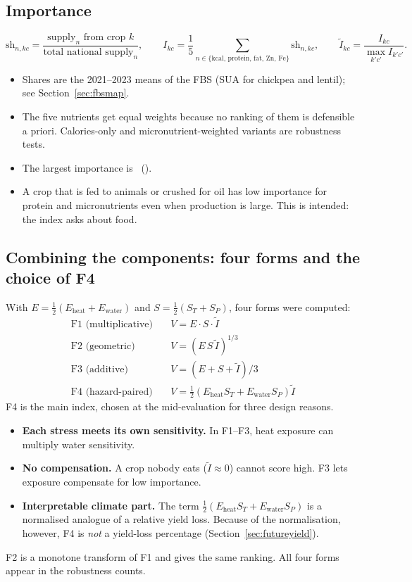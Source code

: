 \subsection{Importance}\label{sec:importance}
\begin{equation}\label{eq:importance}
\text{sh}_{n,kc} = \frac{\text{supply}_{n}\text{ from crop }k}{\text{total national supply}_{n}},\qquad
I_{kc} = \frac15\sum_{n\in\{\text{kcal, protein, fat, Zn, Fe}\}} \text{sh}_{n,kc},\qquad
\tilde I_{kc} = \frac{I_{kc}}{\max_{k'c'} I_{k'c'}}.
\end{equation}
\begin{itemize}
\item Shares are the 2021--2023 means of the FBS (SUA for chickpea and lentil); see Section~\ref{sec:fbsmap}.
\item The five nutrients get equal weights because no ranking of them is defensible a priori. Calories-only and
micronutrient-weighted variants are robustness tests.
\item The largest importance is \ ().
\item A crop that is fed to animals or crushed for oil has low importance for protein and micronutrients even
when production is large. This is intended: the index asks about food.
\end{itemize}

\subsection{Combining the components: four forms and the choice of F4}\label{sec:forms}
With $E=\frac12(E_{\text{heat}}+E_{\text{water}})$ and $S=\frac12(S_T+S_P)$, four forms were computed:
\begin{align}
\text{F1 (multiplicative)}\quad & V = E\cdot S\cdot\tilde I \label{eq:f1}\\
\text{F2 (geometric)}\quad & V = (E\,S\,\tilde I)^{1/3} \label{eq:f2}\\
\text{F3 (additive)}\quad & V = (E+S+\tilde I)/3 \label{eq:f3}\\
\text{F4 (hazard-paired)}\quad & V = \tfrac12\left(E_{\text{heat}}S_T + E_{\text{water}}S_P\right)\tilde I \label{eq:f4}
\end{align}
F4 is the main index, chosen at the mid-evaluation for three design reasons.
\begin{itemize}
\item \textbf{Each stress meets its own sensitivity.} In F1--F3, heat exposure can multiply water sensitivity.
\item \textbf{No compensation.} A crop nobody eats ($\tilde I\approx0$) cannot score high. F3 lets exposure
compensate for low importance.
\item \textbf{Interpretable climate part.} The term $\frac12(E_{\text{heat}}S_T+E_{\text{water}}S_P)$ is a
normalised analogue of a relative yield loss. Because of the normalisation, however, F4 is \emph{not} a yield-loss
percentage (Section~\ref{sec:futureyield}).
\end{itemize}
F2 is a monotone transform of F1 and gives the same ranking. All four forms appear in the robustness counts.

